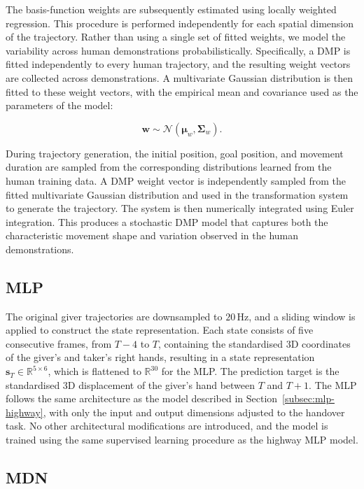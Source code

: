 \documentclass[journal]{IEEEtran}
\begin{document}
The basis-function weights are subsequently estimated using locally weighted regression. This procedure is performed independently for each spatial dimension of the trajectory. Rather than using a single set of fitted weights, we model the variability across human demonstrations probabilistically. Specifically, a DMP is fitted independently to every human trajectory, and the resulting weight vectors are collected across demonstrations. A multivariate Gaussian distribution is then fitted to these weight vectors, with the empirical mean and covariance used as the parameters of the model:

\begin{equation}
\mathbf{w}\sim\mathcal{N}\left(\boldsymbol{\mu}_w,\boldsymbol{\Sigma}_w\right).
\end{equation}

During trajectory generation, the initial position, goal position, and movement duration are sampled from the corresponding distributions learned from the human training data. A DMP weight vector is independently sampled from the fitted multivariate Gaussian distribution and used in the transformation system to generate the trajectory. The system is then numerically integrated using Euler integration. This produces a stochastic DMP model that captures both the characteristic movement shape and variation observed in the human demonstrations.

\subsection{MLP}

The original giver trajectories are downsampled to $20\,\mathrm{Hz}$, and a sliding window is applied to construct the state representation. Each state consists of five consecutive frames, from $T-4$ to $T$, containing the standardised 3D coordinates of the giver's and taker's right hands, resulting in a state representation $\mathbf{s}_T \in \mathbb{R}^{5\times6}$, which is flattened to $\mathbb{R}^{30}$ for the MLP. The prediction target is the standardised 3D displacement of the giver's hand between $T$ and $T+1$. The MLP follows the same architecture as the model described in Section~\ref{subsec:mlp-highway}, with only the input and output dimensions adjusted to the handover task. No other architectural modifications are introduced, and the model is trained using the same supervised learning procedure as the highway MLP model.

\subsection{MDN}
\end{document}
